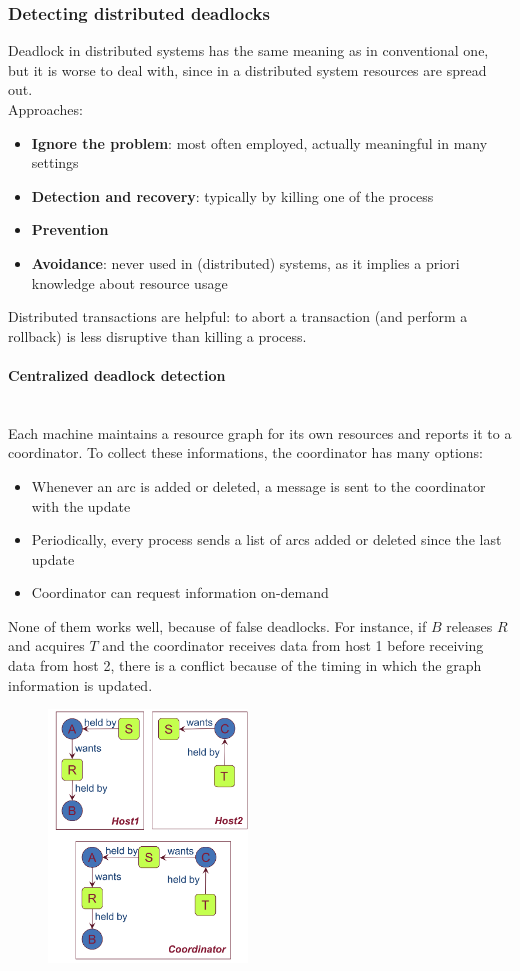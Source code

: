\documentclass[10pt,a4paper]{article}
\newcommand{\myparagraph}[1]{\paragraph{#1}\mbox{}\\[0.05in]}
\begin{document}
\subsubsection{Detecting distributed deadlocks}
Deadlock in distributed systems has the same meaning as in conventional one, but it is worse to deal with, since in a distributed system resources are spread out. \\
Approaches:
\begin{itemize}
	\item \textbf{Ignore the problem}: most often employed, actually meaningful in many settings
	\item \textbf{Detection and recovery}: typically by killing one of the process
	\item \textbf{Prevention}
	\item \textbf{Avoidance}: never used in (distributed) systems, as it implies a priori knowledge about resource usage
\end{itemize}
Distributed transactions are helpful: to abort a transaction (and perform a rollback) is less disruptive than killing a process.
\myparagraph{Centralized deadlock detection}
Each machine maintains a resource graph for its own resources and reports it to a coordinator. To collect these informations, the coordinator has many options:
\begin{itemize}
	\item Whenever an arc is added or deleted, a message is sent to the coordinator with the update
	\item Periodically, every process sends a list of arcs added or deleted since the last update
	\item Coordinator can request information on-demand
\end{itemize}
None of them works well, because of false deadlocks. For instance, if $B$ releases $R$ and acquires $T$ and the coordinator receives data from host 1 before receiving data from host 2, there is a conflict because of the timing in which the graph information is updated.  \pagebreak
\begin{figure}[h!]
\hfill \includegraphics[width=150pt]{images/cent-det.png}\hspace*{\fill}
  \label{fig:cent-det}
\end{figure}
\end{document}

